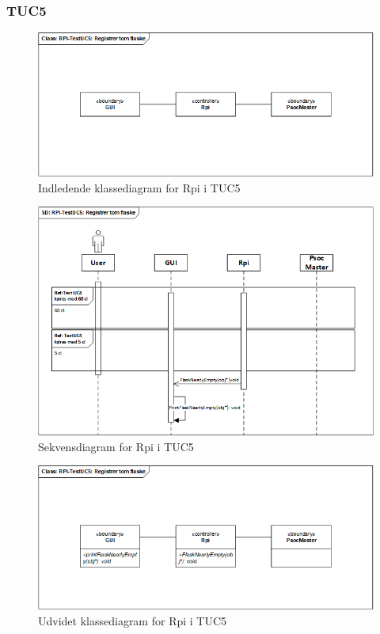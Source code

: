 \subsubsection{TUC5}

\begin{figure}[H]
    \centering
    \includegraphics[width=1\textwidth]{Images/Applikationsmodeller/rpi/rpi_klassediagramTestUC5.png}
    \caption{Indledende klassediagram for Rpi i TUC5}
    \label{fig:cdTUC5Rpi}
\end{figure}

\begin{figure}[H]
    \centering
    \includegraphics[width=1\textwidth]{Images/Applikationsmodeller/rpi/rpi_sekvensdiagramTestUC5.png}
    \caption{Sekvensdiagram for Rpi i TUC5}
    \label{fig:sdTUC5Rpi}
\end{figure}

\begin{figure}[H]
    \centering
    \includegraphics[width=1\textwidth]{Images/Applikationsmodeller/rpi/rpi_UdvidetklassediagramTestUC5.png}
    \caption{Udvidet klassediagram for Rpi i TUC5}
    \label{fig:UcdTUC5Rpi}
\end{figure}

